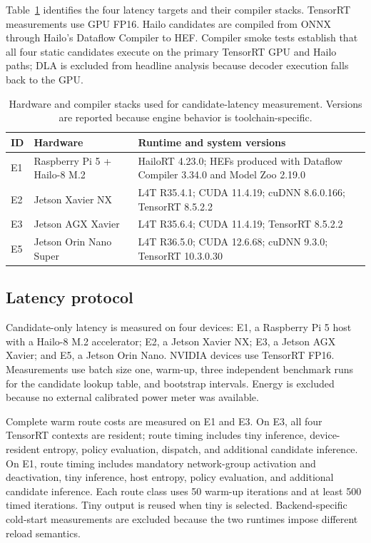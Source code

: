 \documentclass[a4paper,review,12pt]{elsarticle}
\begin{document}
Table~\ref{tab:hardware} identifies the four latency targets and their compiler stacks. TensorRT measurements use GPU FP16. Hailo candidates are compiled from ONNX through Hailo's Dataflow Compiler to HEF. Compiler smoke tests establish that all four static candidates execute on the primary TensorRT GPU and Hailo paths; DLA is excluded from headline analysis because decoder execution falls back to the GPU.

\begin{table}[H]
\centering
\caption{Hardware and compiler stacks used for candidate-latency measurement. Versions are reported because engine behavior is toolchain-specific.}
\label{tab:hardware}
\small
\begin{tabularx}{\textwidth}{@{}llX@{}}
\toprule
ID & Hardware & Runtime and system versions \\
\midrule
E1 & Raspberry Pi 5 + Hailo-8 M.2 & HailoRT 4.23.0; HEFs produced with Dataflow Compiler 3.34.0 and Model Zoo 2.19.0 \\
E2 & Jetson Xavier NX & L4T R35.4.1; CUDA 11.4.19; cuDNN 8.6.0.166; TensorRT 8.5.2.2 \\
E3 & Jetson AGX Xavier & L4T R35.6.4; CUDA 11.4.19; TensorRT 8.5.2.2 \\
E5 & Jetson Orin Nano Super & L4T R36.5.0; CUDA 12.6.68; cuDNN 9.3.0; TensorRT 10.3.0.30 \\
\bottomrule
\end{tabularx}
\end{table}

\subsection{Latency protocol}

Candidate-only latency is measured on four devices: E1, a Raspberry Pi 5 host with a Hailo-8 M.2 accelerator; E2, a Jetson Xavier NX; E3, a Jetson AGX Xavier; and E5, a Jetson Orin Nano. NVIDIA devices use TensorRT FP16. Measurements use batch size one, warm-up, three independent benchmark runs for the candidate lookup table, and bootstrap intervals. Energy is excluded because no external calibrated power meter was available.

Complete warm route costs are measured on E1 and E3. On E3, all four TensorRT contexts are resident; route timing includes tiny inference, device-resident entropy, policy evaluation, dispatch, and additional candidate inference. On E1, route timing includes mandatory network-group activation and deactivation, tiny inference, host entropy, policy evaluation, and additional candidate inference. Each route class uses 50 warm-up iterations and at least 500 timed iterations. Tiny output is reused when tiny is selected. Backend-specific cold-start measurements are excluded because the two runtimes impose different reload semantics.
\end{document}
